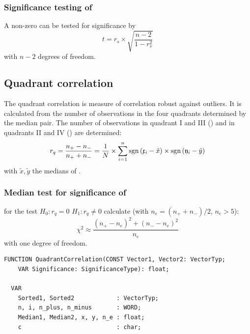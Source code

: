 \begin{refsection}
\subsubsection{Significance testing of }

A non-zero  can be tested for significance by
\begin{equation}
  t = r_s \times \sqrt{\frac{n-2}{1-r_s^2}}
\end{equation}
with \(n-2 \) degrees of freedom.

\subsection{Quadrant correlation }\label{text:quadrant}

The quadrant correlation is measure of correlation robust against outliers. It is calculated from the number of observations in the four quadrants determined by the median pair. The number of observations in quadrant I and III () and in quadrants II and IV () are determined:
\begin{equation}
  r_q = \frac{n_+ - n_-}{n_+ + n_-}  = \frac{1}{N} \times \sum_{i=1}^n{\operatorname{sgn}{(\mathfrak{x}_i - \tilde{x})} \times \operatorname{sgn}{(\mathfrak{y}_i - \tilde{y})}}
\end{equation}
with \(\tilde{x},\tilde{y} \) the medians of .

\subsubsection{Median test for significance of }

for the test \(H_0 : r_q = 0 \)  \(H_1 : r_q \neq 0 \) calculate (with \(n_e = (n_+ + n_-)/2 \), \(n_e > 5 \)):
\begin{equation}
  \chi^2 \approx \frac{(n_+ - n_e)^2 + (n_- - n_e)^2}{n_e}
\end{equation}
with one degree of freedom.

\begin{lstlisting}[caption=Quadrant correlation and its significance]
  FUNCTION QuadrantCorrelation(CONST Vector1, Vector2: VectorTyp;
    VAR Significance: SignificanceType): float;

  VAR
    Sorted1, Sorted2            : VectorTyp;
    n, i, n_plus, n_minus       : WORD;
    Median1, Median2, x, y, n_e : float;
    c                           : char;


\end{lstlisting}
\end{refsection}
